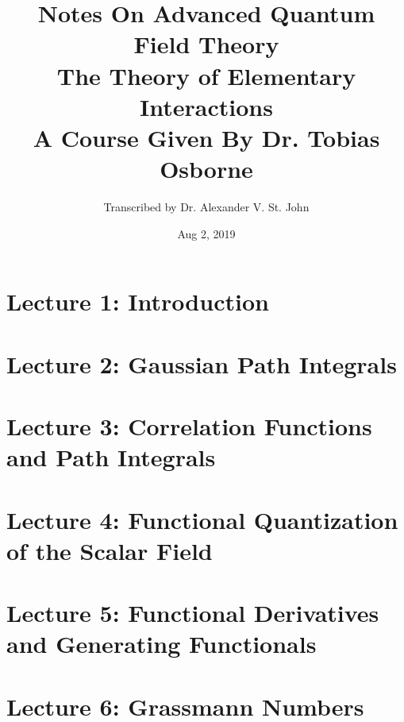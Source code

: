 \documentclass[12pt]{article}
\title{Notes On Advanced Quantum Field Theory \\ The Theory of Elementary Interactions \\ A Course Given By Dr. Tobias Osborne}
\author{Transcribed by Dr. Alexander V. St. John}
\date{Aug 2, 2019}
\begin{document}
\maketitle

\clearpage

\tableofcontents
\newpage

\section{Lecture 1: Introduction}
\label{sec: lec1}



\clearpage

\section{Lecture 2: Gaussian Path Integrals}
\label{sec: lec2}



\clearpage

\section{Lecture 3: Correlation Functions and Path Integrals}
\label{sec: lec3}



\clearpage

\section{Lecture 4: Functional Quantization of the Scalar Field}
\label{sec: lec4}



\clearpage

\section{Lecture 5: Functional Derivatives and Generating Functionals}
\label{sec: lec5}



\clearpage

\section{Lecture 6: Grassmann Numbers}
\label{sec: lec6}


\end{document}
